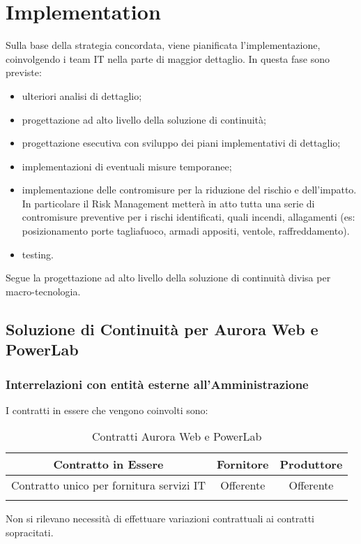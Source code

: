 \newpage
\section{Implementation}
\label{implementation}

Sulla base della strategia concordata, viene pianificata l'implementazione, coinvolgendo i team IT nella parte di maggior dettaglio.
In questa fase sono previste:
\begin{itemize}
\item ulteriori analisi di dettaglio;
\item progettazione ad alto livello della soluzione di continuità;
\item progettazione esecutiva con sviluppo dei piani implementativi di dettaglio;
\item implementazioni di eventuali misure temporanee;
\item implementazione delle contromisure per la riduzione del rischio e dell'impatto. In particolare il Risk Management metterà in atto tutta una serie di contromisure preventive per i rischi identificati, quali incendi, allagamenti (es: posizionamento porte tagliafuoco, armadi appositi, ventole, raffreddamento).
\item testing.
\end{itemize}

Segue la progettazione ad alto livello della soluzione di continuità divisa per macro-tecnologia.

\newpage
\subsection{Soluzione di Continuità per Aurora Web e PowerLab}
\subsubsection{Interrelazioni con entità esterne all’Amministrazione}
I contratti in essere che vengono coinvolti sono:
\renewcommand \arraystretch{1,5}
\begin{longtable}{c c c}
\toprule
\textbf{Contratto in Essere} & \textbf{Fornitore} & \textbf{Produttore} \\
\toprule
	Contratto unico per fornitura servizi IT & Offerente & Offerente \\
\bottomrule
\caption{Contratti Aurora Web e PowerLab}
\end{longtable}
Non si rilevano necessità di effettuare variazioni contrattuali ai contratti sopracitati.

